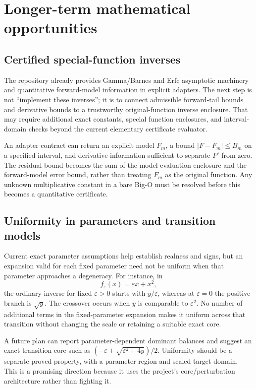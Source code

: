 \documentclass[11pt,a4paper]{article}
\begin{document}
\section{Longer-term mathematical opportunities}
\label{sec:future}
\subsection{Certified special-function inverses}
The repository already provides Gamma/Barnes and Erfc asymptotic machinery
and quantitative forward-model information in explicit adapters. The next
step is not ``implement these inverses''; it is to connect admissible
forward-tail bounds and derivative bounds to a trustworthy original-function
inverse enclosure. That may require additional exact constants, special
function enclosures, and interval-domain checks beyond the current
elementary certificate evaluator.
\cite{special,gamma,certificates}

An adapter contract can return an explicit model $F_m$, a bound
$|F-F_m|\leq B_m$ on a specified interval, and derivative information
sufficient to separate $F'$ from zero. The residual bound becomes the sum
of the model-evaluation enclosure and the forward-model error bound, rather
than treating $F_m$ as the original function. Any unknown multiplicative
constant in a bare Big-O must be resolved before this becomes a quantitative
certificate.

\subsection{Uniformity in parameters and transition models}
Current exact parameter assumptions help establish realness and signs, but
an expansion valid for each fixed parameter need not be uniform when that
parameter approaches a degeneracy. For instance, in
\[
 f_\varepsilon(x)=\varepsilon x+x^2,
\]
the ordinary inverse for fixed $\varepsilon>0$ starts with $y/\varepsilon$,
whereas at $\varepsilon=0$ the positive branch is $\sqrt y$. The crossover
occurs when $y$ is comparable to $\varepsilon^2$. No number of additional
terms in the fixed-parameter expansion makes it uniform across that
transition without changing the scale or retaining a suitable exact core.

A future plan can report parameter-dependent dominant balances and suggest
an exact transition core such as
$(-\varepsilon+\sqrt{\varepsilon^2+4y})/2$. Uniformity should be a separate
proved property, with a parameter region and scaled target domain. This is
a promising direction because it uses the project's core/perturbation
architecture rather than fighting it.
\end{document}
